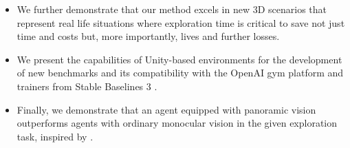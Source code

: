 \begin{itemize}
    \item We further demonstrate that our method excels in new 3D scenarios that represent real life situations where exploration time is critical to save not just time and costs but, more importantly, lives and further losses. 
    
    \item We present the capabilities of Unity-based environments for the development of new benchmarks and its compatibility with the OpenAI gym platform \cite{openaigym} and trainers from Stable Baselines 3 \cite{github-dlr-rm-baselines3}. 

    \item Finally, we demonstrate that an agent equipped with panoramic vision outperforms agents with ordinary monocular vision in the given exploration task, inspired by \textcite{rill2021collision, wojek2012monocular}.

\end{itemize}

